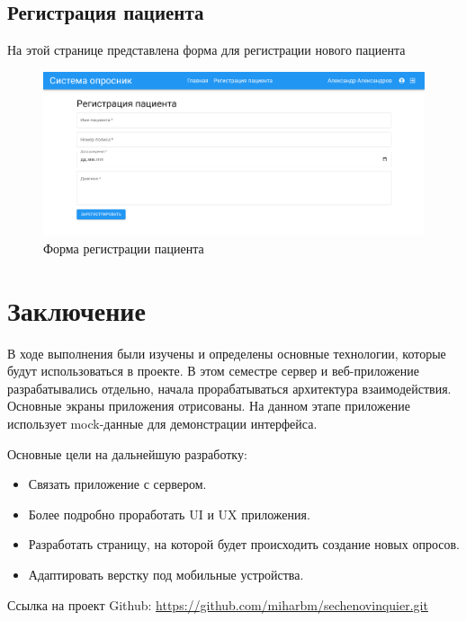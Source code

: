 \documentclass[a4paper,12pt]{article}
\begin{document}
	\newpage
	\subsection{Регистрация пациента}
			На этой странице представлена форма для регистрации нового пациента
			\begin{figure}[h]
				\includegraphics[scale=0.17]{images/screenshots/registration}
				\caption{Форма регистрации пациента}\label{fig:figure7}
			\end{figure}

	\newpage
	\section{Заключение}
		В ходе выполнения были изучены и определены основные технологии, которые будут использоваться в проекте.
		В этом семестре сервер и веб-приложение разрабатывались отдельно, начала прорабатываться архитектура взаимодействия.
		Основные экраны приложения отрисованы.
		На данном этапе приложение использует mock-данные для демонстрации интерфейса.

		Основные цели на дальнейшую разработку:

		\begin{itemize}
			\item Связать приложение с сервером.

			\item Более подробно проработать UI и UX приложения.

			\item Разработать страницу, на которой будет происходить создание новых опросов.

			\item Адаптировать верстку под мобильные устройства.

		\end{itemize}

	Ссылка на проект Github:
	\url{https://github.com/miharbm/sechenovinquier.git}
\end{document}
